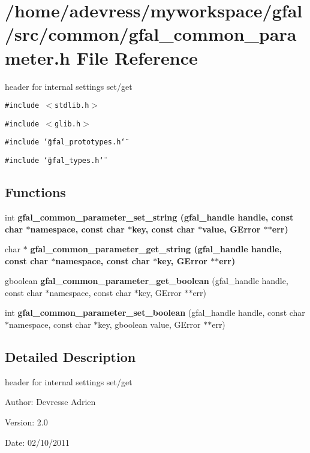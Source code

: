 \section{/home/adevress/myworkspace/gfal/src/common/gfal\_\-common\_\-parameter.h File Reference}
\label{gfal__common__parameter_8h}
header for internal settings set/get 

{\tt \#include $<$stdlib.h$>$}\par
{\tt \#include $<$glib.h$>$}\par
{\tt \#include \char`\"{}gfal\_\-prototypes.h\char`\"{}}\par
{\tt \#include \char`\"{}gfal\_\-types.h\char`\"{}}\par
\subsection*{Functions}
\begin{CompactItemize}
\item 
int \bf{gfal\_\-common\_\-parameter\_\-set\_\-string} (gfal\_\-handle handle, const char $\ast$namespace, const char $\ast$key, const char $\ast$value, GError $\ast$$\ast$err)
\item 
char $\ast$ \bf{gfal\_\-common\_\-parameter\_\-get\_\-string} (gfal\_\-handle handle, const char $\ast$namespace, const char $\ast$key, GError $\ast$$\ast$err)
\item 
gboolean \textbf{gfal\_\-common\_\-parameter\_\-get\_\-boolean} (gfal\_\-handle handle, const char $\ast$namespace, const char $\ast$key, GError $\ast$$\ast$err)\label{gfal__common__parameter_8h_b57c6f6aed12cfceb7ee631a0ef01b44}

\item 
int \textbf{gfal\_\-common\_\-parameter\_\-set\_\-boolean} (gfal\_\-handle handle, const char $\ast$namespace, const char $\ast$key, gboolean value, GError $\ast$$\ast$err)\label{gfal__common__parameter_8h_b1a9abb4de98df443fec2e491b4b6c54}

\end{CompactItemize}


\subsection{Detailed Description}
header for internal settings set/get 

\begin{Desc}
\item[Author:]Devresse Adrien \end{Desc}
\begin{Desc}
\item[Version:]2.0 \end{Desc}
\begin{Desc}
\item[Date:]02/10/2011 \end{Desc}


